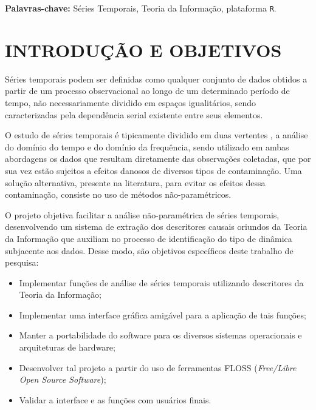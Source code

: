 \documentclass[12pt,letterpaper]{article}
\begin{document}
\textbf{Palavras-chave:} Séries Temporais, Teoria da Informação, plataforma \texttt R.


\newpage
\section*{\centering \textbf{INTRODUÇÃO E OBJETIVOS}} %

Séries temporais podem ser definidas como qualquer conjunto de dados obtidos a partir de um processo observacional ao longo de um determinado período de tempo, não necessariamente dividido em espaços igualitários, sendo caracterizadas pela dependência serial existente entre seus elementos. 

O estudo de séries temporais é tipicamente dividido em duas vertentes \cite{BrockwellDavis91}, a análise do domínio do tempo e do domínio da frequência, sendo utilizado em ambas abordagens os dados que resultam diretamente das observações coletadas, que por sua vez estão sujeitos a efeitos danosos de diversos tipos de contaminação. 
Uma solução alternativa, presente na literatura, para evitar os efeitos dessa contaminação, consiste no uso de métodos não-paramétricos.

O projeto objetiva facilitar a análise não-paramétrica de séries temporais, desenvolvendo um sistema de extração dos descritores causais oriundos da Teoria da Informação que auxiliam no processo de identificação do tipo de dinâmica subjacente aos dados. Desse modo, são objetivos específicos deste trabalho de pesquisa:

\begin{itemize}
\item Implementar funções de análise de séries temporais utilizando descritores da Teoria da Informação;
\item Implementar uma interface gráfica amigável para a aplicação de tais funções;
\item Manter a portabilidade do software para os diversos sistemas operacionais e arquiteturas de hardware;
\item Desenvolver tal projeto a partir do uso de ferramentas FLOSS (\textit{Free/Libre Open Source Software});
\item Validar a interface e as funções com usuários finais.
\end{itemize}

\end{document}
